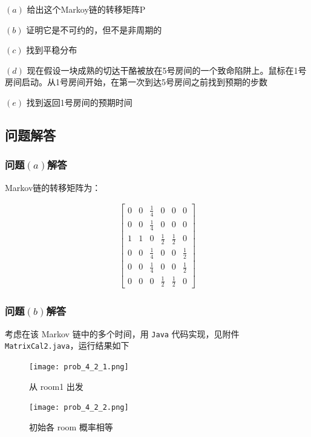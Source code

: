 \documentclass[12pt,a4paper]{article}%
\begin{document}
$\left(a\right)$ 给出这个Markoy链的转移矩阵P

$\left(b\right)$ 证明它是不可约的，但不是非周期的

$\left(c\right)$ 找到平稳分布

$\left(d\right)$ 现在假设一块成熟的切达干酪被放在5号房间的一个致命陷阱上。鼠标在1号房间启动。从1号房间开始，在第一次到达5号房间之前找到预期的步数

$\left(e\right)$ 找到返回1号房间的预期时间
\subsection{问题解答}
\subsubsection{问题$\left(a\right)$解答}
Markov链的转移矩阵为：

\begin{gather*}
    \begin{bmatrix}
        0 & 0 & \frac{1}{4} & 0           & 0           & 0           \\
        0 & 0 & \frac{1}{4} & 0           & 0           & 0           \\
        1 & 1 & 0           & \frac{1}{2} & \frac{1}{2} & 0           \\
        0 & 0 & \frac{1}{4} & 0           & 0           & \frac{1}{2} \\
        0 & 0 & \frac{1}{4} & 0           & 0           & \frac{1}{2} \\
        0 & 0 & 0           & \frac{1}{2} & \frac{1}{2} & 0
    \end{bmatrix}
\end{gather*}

\subsubsection{问题$\left(b\right)$解答}
考虑在该 Markov 链中的多个时间，用 \texttt{Java} 代码实现，见附件 \texttt{MatrixCal2.java}，运行结果如下

    \begin{figure}[H]%
        \centering
        \begin{minipage}{0.48\textwidth}
            \centering
            \texttt{[image: prob\_4\_2\_1.png]}
            \caption{\fontsize{10pt}{15pt}\selectfont 从 room1 出发}
        \end{minipage}
        \hspace{0cm}%
        \hfill%
        \begin{minipage}{0.48\textwidth}
            \centering
            \texttt{[image: prob\_4\_2\_2.png]}
            \caption{\fontsize{10pt}{15pt}\selectfont 初始各 room 概率相等}
        \end{minipage}\label{fig:figure2}
    \end{figure}
\end{document}
